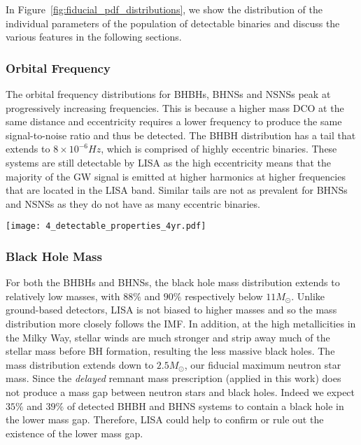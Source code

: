 In Figure~\ref{fig:fiducial_pdf_distributions}, we show the distribution of the individual parameters of the population of detectable binaries and discuss the various features in the following sections.

\subsubsection{Orbital Frequency}
The orbital frequency distributions for BHBHs, BHNSs and NSNSs peak at progressively increasing frequencies. This is because a higher mass DCO at the same distance and eccentricity requires a lower frequency to produce the same signal-to-noise ratio and thus be detected. The BHBH distribution has a tail that extends to $8 \times 10^{-6} \unit{Hz}$, which is comprised of highly eccentric binaries. These systems are still detectable by LISA as the high eccentricity means that the majority of the GW signal is emitted at higher harmonics at higher frequencies that are located in the LISA band. Similar tails are not as prevalent for BHNSs and NSNSs as they do not have as many eccentric binaries.

\begin{figure*}[t]
    \centering
    \texttt{[image: 4\_detectable\_properties\_4yr.pdf]}
    \caption{Properties of detectable systems for a 4-year LISA mission in our fiducial model. Each panel shows a kernel density estimator for a single property, coloured by DCO type. The shaded areas show the 1- and 2-$\sigma$ uncertainties (obtained via bootstrapping). The dotted lines in the black hole mass panel show the individual primary and secondary mass distributions. See Sec.~\ref{sec:fiducial_distributions} for a discussion.}
    \label{fig:fiducial_pdf_distributions}
\end{figure*}

\subsubsection{Black Hole Mass}
For both the BHBHs and BHNSs, the black hole mass distribution extends to relatively low masses, with $88\%$ and $90\%$ respectively below $11 \unit{M_{\odot}}$. Unlike ground-based detectors, LISA is not biased to higher masses and so the mass distribution more closely follows the IMF. In addition, at the high metallicities in the Milky Way, stellar winds are much stronger and strip away much of the stellar mass before BH formation, resulting the less massive black holes. The mass distribution extends down to $2.5 \unit{M_{\odot}}$, our fiducial maximum neutron star mass. Since the \citet{Fryer+2012} \textit{delayed} remnant mass prescription (applied in this work) does not produce a mass gap between neutron stars and black holes. Indeed we expect $35\%$ and $39\%$ of detected BHBH and BHNS systems to contain a black hole in the lower mass gap. Therefore, LISA could help to confirm or rule out the existence of the lower mass gap.

